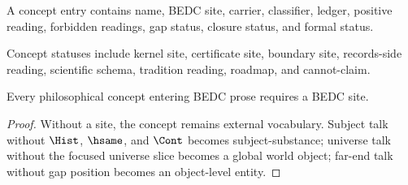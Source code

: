 \begin{definition}
\label{def:philosophy-concept-registry-entry}
A concept entry contains name, BEDC site, carrier, classifier, ledger,
positive reading, forbidden readings, gap status, closure status, and
formal status.
\end{definition}

\begin{definition}
\label{def:philosophy-concept-status}
Concept statuses include kernel site, certificate site, boundary site,
records-side reading, scientific schema, tradition reading, roadmap,
and cannot-claim.
\end{definition}

\begin{theorem}
\label{thm:philosophy-concepts-require-bedc-sites}
Every philosophical concept entering BEDC prose requires a BEDC site.
\end{theorem}
\begin{proof}
Without a site, the concept remains external vocabulary. Subject talk
without \(\Hist\), \(\hsame\), and \(\Cont\) becomes subject-substance;
universe talk without the focused universe slice becomes a global
world object; far-end talk without gap position becomes an object-level
entity.
\end{proof}

